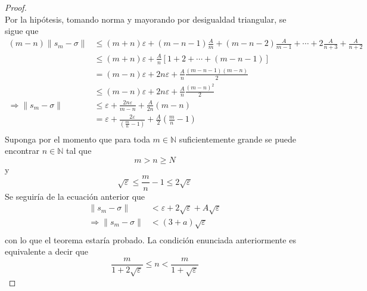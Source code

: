 \documentclass[12pt]{report}
\theoremstyle{largebreak}
\renewcommand{\leq}{\ensuremath{\leqslant}}
\renewcommand{\geq}{\ensuremath{\geqslant}}
\newcommand\norm[1]{\ensuremath{\|#1\|}}
\begin{document}
\begin{proof}
\begin{equation*}
        \end{equation*}
        Por la hipótesis, tomando norma y mayorando por desigualdad triangular, se sigue que
        \begin{equation*}
            \begin{split}
                (m-n)\norm{s_m-\sigma}&\leq (m+n)\varepsilon+(m-n-1)\frac{A}{m}+(m-n-2)\frac{A}{m-1}+\cdots+2\frac{A}{n+3}+\frac{A}{n+2}\\
                &\leq (m+n)\varepsilon+\frac{A}{n}\left[1+2+\cdots+(m-n-1) \right]\\
                &=(m-n)\varepsilon+2n\varepsilon+\frac{A}{n}\frac{(m-n-1)(m-n)}{2}\\
                &\leq(m-n)\varepsilon+2n\varepsilon+\frac{A}{n}\frac{(m-n)^2}{2}\\
                \Rightarrow \norm{s_m-\sigma}&\leq\varepsilon+\frac{2n\varepsilon}{m-n}+\frac{A}{2n}(m-n)\\
                &=\varepsilon+\frac{2\varepsilon}{\left(\frac{m}{n}-1\right)}+\frac{A}{2}\left(\frac{m}{n}-1\right)\\
            \end{split}
        \end{equation*}
        Suponga por el momento que para toda $m\in\mathbb{N}$ suficientemente grande se puede encontrar $n\in\mathbb{N}$ tal que
        \begin{equation*}
            m>n\geq N
        \end{equation*}
        y
        \begin{equation*}
            \sqrt{\varepsilon}\leq\frac{m}{n}-1\leq2\sqrt{\varepsilon}
        \end{equation*}
        Se seguiría de la ecuación anterior que
        \begin{equation*}
            \begin{split}
                \norm{s_m-\sigma}&<\varepsilon+2\sqrt{\varepsilon}+A\sqrt{\varepsilon}\\
                \Rightarrow \norm{s_m-\sigma}&<(3+a)\sqrt{\varepsilon}\\
            \end{split}
        \end{equation*}
        con lo que el teorema estaría probado. La condición enunciada anteriormente es equivalente a decir que
        \begin{equation*}
            \frac{m}{1+2\sqrt{\varepsilon}}\leq n<\frac{m}{1+\sqrt{\varepsilon}}
        \end{equation*}

\end{proof}
\end{document}
